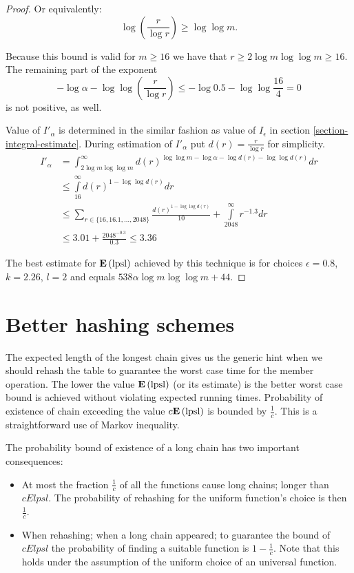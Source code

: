 \begin{proof}
Or equivalently:
\[
	\log \left( \frac{r}{\log r} \right) \geq \log \log m \text{.}
\]

Because this bound is valid for $m \geq 16$ we have that $r \geq 2 \log m \log \log m \geq 16$. The remaining part of the exponent \[ -\log \alpha - \log \log \left( \frac{r}{\log r} \right) \leq -\log 0.5 - \log \log \frac{16}{4} = 0 \] is not positive, as well. 

Value of $I'_\alpha$ is determined in the similar fashion as value of $I_\epsilon$ in section \ref{section-integral-estimate}. During estimation of $I'_\alpha$ put $d(r) = \frac{r}{\log r}$ for simplicity.
\[
\begin{split}
I'_\alpha 
	& = \int_{2 \log m \log \log m}^{\infty} d(r) ^ {\log \log m - \log \alpha - \log d(r) - \log \log d(r)} dr \\
	& \leq \int\limits_{16}^{\infty} d(r) ^ {1 - \log \log d(r)} dr \\
	& \leq \displaystyle\sum_{r \in \{16, 16.1, \dots, 2048 \}} \frac{d(r) ^ {1 - \log \log d(r)}}{10} + 
		\int\limits_{2048}^{\infty} r ^ {-1.3} dr \\
	& \leq 3.01 + \frac{2048 ^ {-0.3}}{0.3} \leq 3.36
\end{split}
\]

The best estimate for $\mathbf{E}\left(\mathrm{lpsl}\right)$ achieved by this technique is for choices $\epsilon = 0.8$, $k = 2.26$, $l = 2$ and equals $538 \alpha \log m \log \log m + 44$.
\end{proof}

\section{Better hashing schemes}
The expected length of the longest chain gives us the generic hint when we should rehash the table to guarantee the worst case time for the member operation. The lower the value $\mathbf{E}\left(\mathrm{lpsl}\right)$ (or its estimate) is the better worst case bound is achieved without violating expected running times. Probability of existence of  chain exceeding the value $c \mathbf{E}\left(\mathrm{lpsl}\right)$ is bounded by $\frac{1}{c}$. This is a straightforward use of Markov inequality. 

The probability bound of existence of a long chain has two important consequences:
\begin{itemize}
\item At most the fraction $\frac{1}{c}$ of all the functions cause long chains; longer than $c E lpsl$. The probability of rehashing for the uniform function's choice is then $\frac{1}{c}$.
\item When rehashing; when a long chain appeared; to guarantee the bound of $c E lpsl$ the probability of finding a suitable function is $1 - \frac{1}{c}$. Note that this holds under the assumption of the uniform choice of an universal function.
\end{itemize}

